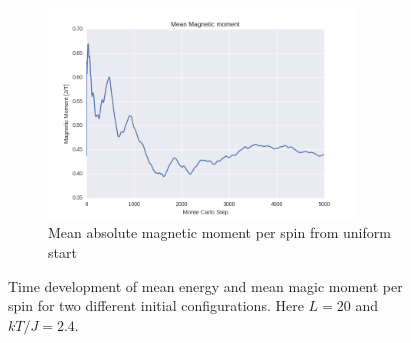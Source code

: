 \documentclass[a4paper, 10pt]{article}
\begin{document}
\begin{figure}[!ht]
    ~ 
    \begin{subfigure}[H!]{0.5\textwidth}
        \centering
        \includegraphics[height=2.2in]{meanMagMomWUpStartT24.png}
        \caption{Mean absolute magnetic moment per spin from uniform start}
    \end{subfigure}
      \caption{Time development of mean energy and mean magic moment per spin for two different initial configurations. Here $L=20$ and $kT/J=2.4$.}\label{fig:20x20_Sweep_T_24}
\end{figure}
\end{document}
